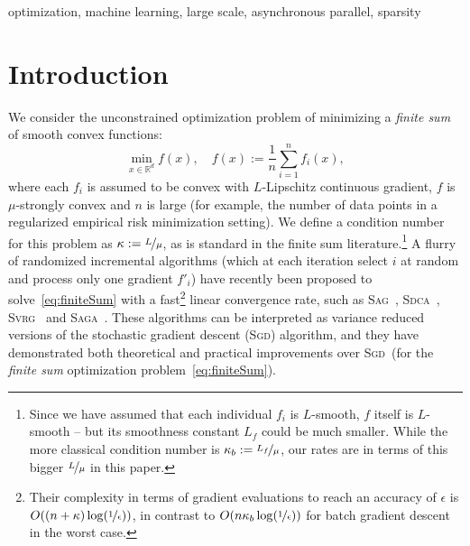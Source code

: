 \documentclass[twoside, 11pt]{article}
\newcommand{\strongconvex}{\mu}
\newcommand{\lipschitz}{L}
\newcommand{\SAGA}{\textsc{Saga}}
\newcommand{\SAG}{\textsc{Sag}}
\newcommand{\SVRG}{\textsc{Svrg}}
\newcommand{\SDCA}{\textsc{Sdca}}
\newcommand{\SGD}{\textsc{Sgd}}
\begin{document}
\begin{keywords}
  optimization, machine learning, large scale, asynchronous parallel, sparsity
\end{keywords}

\section{Introduction}
We consider the unconstrained optimization problem of minimizing a \emph{finite sum} of smooth convex functions:
\begin{equation} \label{eq:finiteSum}
\min_{x \in \mathbb{R}^d} f(x), \quad f(x) := \frac{1}{n} \sum_{i=1}^{n} f_i(x),
\end{equation}
where each $f_i$ is assumed to be convex with $\lipschitz$-Lipschitz continuous gradient, $f$ is $\mu$-strongly convex and $n$ is large (for example, the number of data points in a regularized empirical risk minimization setting).
We define a condition number for this problem as $\kappa := \nicefrac{\lipschitz}{\mu}$, as is standard in the finite sum literature.\footnote{Since we have assumed that each individual $f_i$ is $L$-smooth, $f$ itself is $L$-smooth – but its smoothness constant $L_f$ could be much smaller. While the more classical condition number is $\kappa_b := \nicefrac{L_f}{\strongconvex}$, our rates are in terms of this bigger $\nicefrac{L}{\strongconvex}$ in this paper.}
A flurry of randomized incremental algorithms (which at each iteration select $i$ at random and process only one gradient $f'_i$) have recently been proposed to solve~\eqref{eq:finiteSum} with a fast\footnote{Their complexity in terms of gradient evaluations to reach an accuracy of $\epsilon$ is $O((n+\kappa)\log(\nicefrac{1}{\epsilon}))$, in contrast to $O(n\kappa_b\log(\nicefrac{1}{\epsilon}))$ for batch gradient descent in the worst case.} linear convergence rate, such as \SAG~\citep{SAG}, \SDCA~\citep{SDCA}, \SVRG~\citep{svrg} and \SAGA~\citep{SAGA}.
These algorithms can be interpreted as variance reduced versions of the stochastic gradient descent (\SGD) algorithm, and they have demonstrated both theoretical and practical improvements over \SGD\ (for the \emph{finite sum} optimization problem~\ref{eq:finiteSum}).
\end{document}
